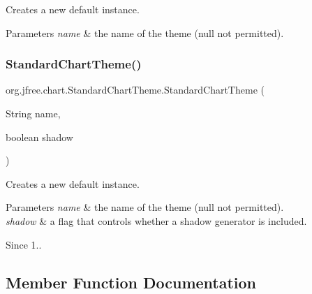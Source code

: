 Creates a new default instance.


\begin{DoxyParams}{Parameters}
{\em name} & the name of the theme ({\ttfamily null} not permitted). \\
\hline
\end{DoxyParams}
\mbox{\label{classorg_1_1jfree_1_1chart_1_1_standard_chart_theme_af4ac6d4bcb4adde6cfca75b899177aaf}} 
\subsubsection{\texorpdfstring{Standard\+Chart\+Theme()}{StandardChartTheme()}\hspace{0.1cm}{\footnotesize\ttfamily [2/2]}}
{\footnotesize\ttfamily org.\+jfree.\+chart.\+Standard\+Chart\+Theme.\+Standard\+Chart\+Theme (\begin{DoxyParamCaption}\item[{String}]{name,  }\item[{boolean}]{shadow }\end{DoxyParamCaption})}

Creates a new default instance.


\begin{DoxyParams}{Parameters}
{\em name} & the name of the theme ({\ttfamily null} not permitted). \\
\hline
{\em shadow} & a flag that controls whether a shadow generator is included.\\
\hline
\end{DoxyParams}
\begin{DoxySince}{Since}
1.. 
\end{DoxySince}


\subsection{Member Function Documentation}
\mbox{\label{classorg_1_1jfree_1_1chart_1_1_standard_chart_theme_a70be2e38a735bc70a8da19ba525ab536}} 
